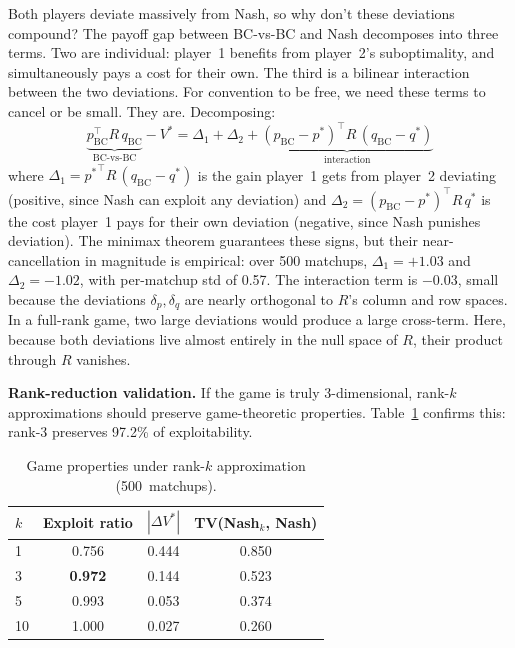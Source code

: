 \documentclass{article}
\begin{document}
Both players deviate massively from Nash, so why don't these deviations compound? The payoff gap between BC-vs-BC and Nash decomposes into three terms. Two are individual: player~1 benefits from player~2's suboptimality, and simultaneously pays a cost for their own. The third is a bilinear interaction between the two deviations. For convention to be free, we need these terms to cancel or be small. They are. Decomposing:
\begin{equation}
\underbrace{p_\text{BC}^\top R\, q_\text{BC}}_{\text{BC-vs-BC}} - V^* = \Delta_1 + \Delta_2 + \underbrace{(p_\text{BC} - p^*)^\top R\, (q_\text{BC} - q^*)}_{\text{interaction}}
\label{eq:decomp}
\end{equation}
where $\Delta_1 = {p^*}^\top R\, (q_\text{BC} - q^*)$ is the gain player~1 gets from player~2 deviating (positive, since Nash can exploit any deviation) and $\Delta_2 = (p_\text{BC} - p^*)^\top R\, q^*$ is the cost player~1 pays for their own deviation (negative, since Nash punishes deviation). The minimax theorem guarantees these signs, but their near-cancellation in magnitude is empirical: over 500 matchups, $\Delta_1 = +1.03$ and $\Delta_2 = -1.02$, with per-matchup std of 0.57. The interaction term is $-0.03$, small because the deviations $\delta_p, \delta_q$ are nearly orthogonal to $R$'s column and row spaces. In a full-rank game, two large deviations would produce a large cross-term. Here, because both deviations live almost entirely in the null space of $R$, their product through $R$ vanishes.

\textbf{Rank-reduction validation.} If the game is truly 3-dimensional, rank-$k$ approximations should preserve game-theoretic properties. Table~\ref{tab:rank_reduction} confirms this: rank-3 preserves 97.2\% of exploitability.

\begin{table}[t]
\caption{Game properties under rank-$k$ approximation (500~matchups).}
\label{tab:rank_reduction}
\vskip 0.1in
\centering
\small
\begin{tabular}{lccc}
\toprule
$k$ & Exploit ratio & $|\Delta V^*|$ & TV(Nash$_k$, Nash) \\
\midrule
1 & 0.756 & 0.444 & 0.850 \\
3 & \textbf{0.972} & 0.144 & 0.523 \\
5 & 0.993 & 0.053 & 0.374 \\
10 & 1.000 & 0.027 & 0.260 \\
\bottomrule
\end{tabular}
\vskip -0.1in
\end{table}
\end{document}
